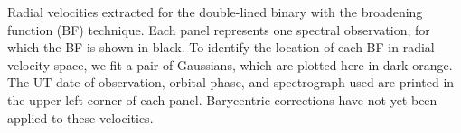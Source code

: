 \label{fig:bffig} Radial velocities extracted for the double-lined binary with the broadening function (BF) technique. Each panel represents one spectral observation, for which the BF is shown in black. To identify the location of each BF in radial velocity space, we fit a pair of Gaussians, which are plotted here in dark orange. The UT date of observation, orbital phase, and spectrograph used are printed in the upper left corner of each panel. Barycentric corrections have not yet been applied to these velocities.